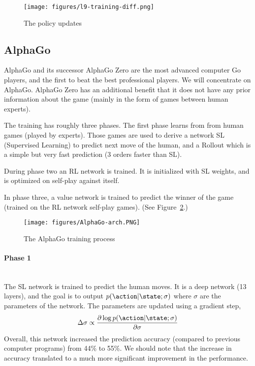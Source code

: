 \begin{figure}
  \begin{centering}
 \texttt{[image: figures/l9-training-diff.png]}\\
  \caption{The policy updates}\label{fig:training-diff}
  \end{centering}
\end{figure}




\subsection{AlphaGo}

AlphaGo and its successor AlphaGo Zero are the most advanced
computer Go players, and the first to beat the best professional
players. We will concentrate on AlphaGo. AlphaGo Zero has an
additional benefit that it does not have any prior information about
the game (mainly in the form of games between human experts).

The training has roughly three phases. The first phase learns from
from human games (played by experts). Those games are used to derive
a network SL (Supervised Learning) to predict next move of the
human, and a Rollout which is a simple but very fast prediction (3
orders faster than SL).

During phase two an RL network is trained. It is initialized with SL
weights, and is optimized on self-play against itself.

In phase three, a value network is trained to predict the winner of
the game (trained on the RL network self-play games). (See
Figure~\ref{fig:AlphaGo-arch}.)


\begin{figure}
  \begin{centering}
  \texttt{[image: figures/AlphaGo-arch.PNG]}\\
  \caption{The AlphaGo training process}\label{fig:AlphaGo-arch}
  \end{centering}
\end{figure}

\paragraph{Phase 1}\ \\
The SL network is trained to predict the human moves. It is a deep
network (13 layers), and the goal is to output
$p(\action|\state;\sigma)$ where $\sigma$ are the parameters of the
network. The parameters are updated using a gradient step,
\[
\Delta \sigma \propto \frac{\partial \log
p(\action|\state;\sigma)}{\partial \sigma}
\]
Overall, this network increased the prediction accuracy (compared to
previous computer programs) from 44\% to 55\%. We should note that
the increase in accuracy translated to a much more significant
improvement in the performance.


